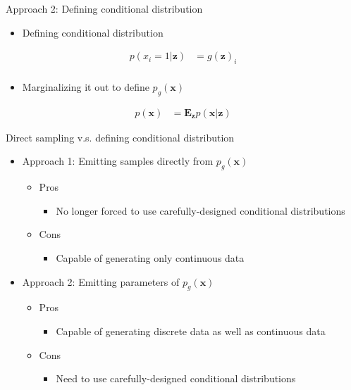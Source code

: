 \documentclass[dvipdfmx,presentation]{beamer}
\def\bf{\mathbf}
\begin{document}
\begin{frame}[label={sec:orgheadline17}]{Approach 2: Defining conditional distribution}
\begin{itemize}
\item Defining conditional distribution
\end{itemize}

\begin{align*}
p(x_{i} = 1 | \bf{z}) &= g(\bf{z})_{i} \tag{20.74} \\
\end{align*}

\begin{itemize}
\item Marginalizing it out to define \(p_{g}(\bf{x})\)
\end{itemize}

\begin{align*}
p(\bf{x}) &= \mathbf{E}_{\bf{z}} p(\bf{x} | \bf{z}) \tag{20.75}
\end{align*}
\end{frame}

\begin{frame}[label={sec:orgheadline18}]{Direct sampling v.s. defining conditional distribution}
\begin{itemize}
\item Approach 1: Emitting samples directly from \(p_{g}(\bf{x})\)
\begin{itemize}
\item Pros
\begin{itemize}
\item No longer forced to use carefully-designed conditional distributions
\end{itemize}
\item Cons
\begin{itemize}
\item Capable of generating only continuous data
\end{itemize}
\end{itemize}
\item Approach 2: Emitting parameters of \(p_{g}(\bf{x})\)
\begin{itemize}
\item Pros
\begin{itemize}
\item Capable of generating discrete data as well as continuous data
\end{itemize}
\item Cons
\begin{itemize}
\item Need to use carefully-designed conditional distributions
\end{itemize}
\end{itemize}
\end{itemize}
\end{frame}
\end{document}
